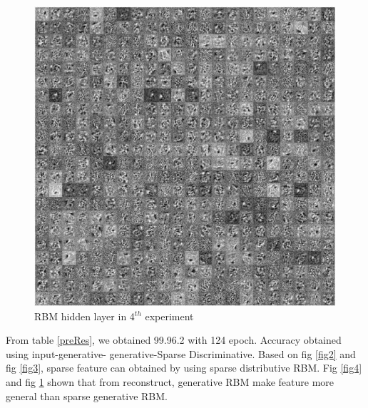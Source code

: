 \documentclass[conference]{IEEEtran}
\begin{document}
\begin{figure}[h]
	\centering
	\includegraphics[width=.5\textwidth]{pics/fig5.jpg}
	\caption{RBM hidden layer in 4$^{th}$ experiment}
	\label{fig5}
\end{figure}

From  table \ref{preRes}, we obtained 99.96.2%
with 124 epoch. Accuracy obtained using input-generative-
generative-Sparse Discriminative. Based on fig \ref{fig2} and fig \ref{fig3},
sparse feature can obtained by using sparse distributive RBM.
Fig \ref{fig4} and fig \ref{fig5} shown that from reconstruct, generative RBM
make feature more general than sparse generative RBM.
\end{document}
